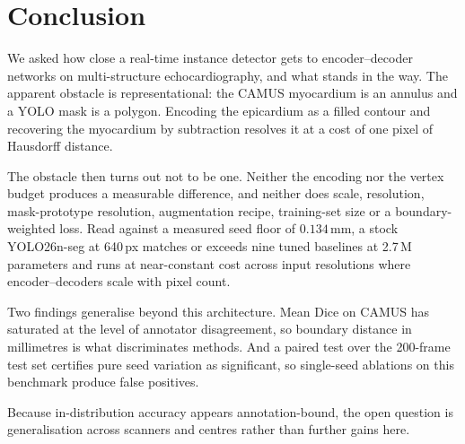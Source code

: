 \section{Conclusion}

We asked how close a real-time instance detector gets to encoder--decoder
networks on multi-structure echocardiography, and what stands in the way. The
apparent obstacle is representational: the CAMUS myocardium is an annulus and a
YOLO mask is a polygon. Encoding the epicardium as a filled contour and
recovering the myocardium by subtraction resolves it at a cost of one pixel of
Hausdorff distance.

The obstacle then turns out not to be one. Neither the encoding nor the vertex
budget produces a measurable difference, and neither does scale, resolution,
mask-prototype resolution, augmentation recipe, training-set size or a
boundary-weighted loss. Read against a measured seed floor of $0.134$\,mm, a
stock YOLO26n-seg at 640\,px matches or exceeds nine tuned baselines at 2.7\,M
parameters and runs at near-constant cost across input resolutions where
encoder--decoders scale with pixel count.

Two findings generalise beyond this architecture. Mean Dice on CAMUS has
saturated at the level of annotator disagreement, so boundary distance in
millimetres is what discriminates methods. And a paired test over the 200-frame
test set certifies pure seed variation as significant, so single-seed ablations
on this benchmark produce false positives.

Because in-distribution accuracy appears annotation-bound, the open question is
generalisation across scanners and centres rather than further gains here.

